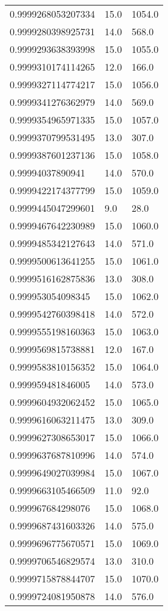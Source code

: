 \begin{center}
\begin{supertabular}[H]{p{0.30\textwidth}p{0.05\textwidth}p{0.05\textwidth}}
0.9999268053207334 & 15.0 & 1054.0 \\ 
0.9999280398925731 & 14.0 & 568.0 \\ 
0.9999293638393998 & 15.0 & 1055.0 \\ 
0.9999310174114265 & 12.0 & 166.0 \\ 
0.9999327114774217 & 15.0 & 1056.0 \\ 
0.9999341276362979 & 14.0 & 569.0 \\ 
0.9999354965971335 & 15.0 & 1057.0 \\ 
0.9999370799531495 & 13.0 & 307.0 \\ 
0.9999387601237136 & 15.0 & 1058.0 \\ 
0.99994037890941 & 14.0 & 570.0 \\ 
0.9999422174377799 & 15.0 & 1059.0 \\ 
0.9999445047299601 & 9.0 & 28.0 \\ 
0.9999467642230989 & 15.0 & 1060.0 \\ 
0.9999485342127643 & 14.0 & 571.0 \\ 
0.9999500613641255 & 15.0 & 1061.0 \\ 
0.9999516162875836 & 13.0 & 308.0 \\ 
0.999953054098345 & 15.0 & 1062.0 \\ 
0.9999542760398418 & 14.0 & 572.0 \\ 
0.9999555198160363 & 15.0 & 1063.0 \\ 
0.9999569815738881 & 12.0 & 167.0 \\ 
0.9999583810156352 & 15.0 & 1064.0 \\ 
0.999959481846005 & 14.0 & 573.0 \\ 
0.9999604932062452 & 15.0 & 1065.0 \\ 
0.9999616063211475 & 13.0 & 309.0 \\ 
0.9999627308653017 & 15.0 & 1066.0 \\ 
0.9999637687810996 & 14.0 & 574.0 \\ 
0.9999649027039984 & 15.0 & 1067.0 \\ 
0.9999663105466509 & 11.0 & 92.0 \\ 
0.999967684298076 & 15.0 & 1068.0 \\ 
0.9999687431603326 & 14.0 & 575.0 \\ 
0.9999696775670571 & 15.0 & 1069.0 \\ 
0.9999706546829574 & 13.0 & 310.0 \\ 
0.9999715878844707 & 15.0 & 1070.0 \\ 
0.9999724081950878 & 14.0 & 576.0 \\ 

\end{supertabular}
\end{center}
